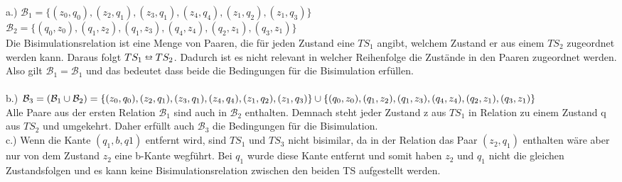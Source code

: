 \documentclass[a4paper,12pt]{scrartcl}
\begin{document}
\subsubsection{}
a.) $\mathcal{B}_1 = \{(z_0,q_0),(z_2,q_1),(z_3,q_1),(z_4,q_4),(z_1,q_2),(z_1,q_3)\}$\\
$\mathcal{B}_2 = \{(q_0,z_0),(q_1,z_2),(q_1,z_3),(q_4,z_4),(q_2,z_1),(q_3,z_1)\}$\\
Die Bisimulationsrelation ist eine Menge von Paaren, die für jeden Zustand eine $TS_1$ angibt, welchem Zustand er aus einem $TS_2$ zugeordnet werden kann. Daraus folgt $TS_1 \leftrightarroweq TS_2$. Dadurch ist es nicht relevant in welcher Reihenfolge die Zustände in den Paaren zugeordnet werden. Also gilt $\mathcal{B}_1 = \mathcal{B}_1$ und das bedeutet dass beide die Bedingungen für die Bisimulation erfüllen.\\\\
b.) $\mathcal{B}_3 = (\mathcal{B}_1\cup \mathcal{B}_2)=\{(z_0,q_0),(z_2,q_1),(z_3,q_1),(z_4,q_4),(z_1,q_2),(z_1,q_3)\}\cup \\\{(q_0,z_0),(q_1,z_2),(q_1,z_3),(q_4,z_4),(q_2,z_1),(q_3,z_1)\}$\\
Alle Paare aus der ersten Relation $\mathcal{B}_1$ sind auch in $\mathcal{B}_2$ enthalten. Demnach steht jeder Zustand z aus $TS_1$ in Relation zu einem Zustand q aus $TS_2$ und umgekehrt. Daher erfüllt auch $\mathcal{B}_3$ die Bedingungen für die Bisimulation.\\
c.) Wenn die Kante $(q_1,b,q1)$ entfernt wird, sind $TS_1$ und $TS_3$ nicht bisimilar, da in der Relation das Paar $(z_2,q_1)$ enthalten wäre aber nur von dem Zustand $z_2$ eine b-Kante wegführt. Bei $q_1$ wurde diese Kante entfernt und somit haben $z_2$ und $q_1$ nicht die gleichen Zustandsfolgen und es kann keine Bisimulationsrelation zwischen den beiden TS aufgestellt werden.
\end{document}

